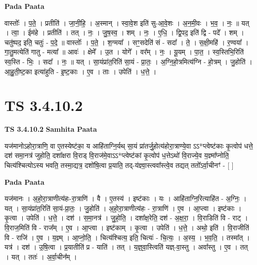 \documentclass[17pt]{extarticle}
\begin{document}
\textbf{Pada Paata} \newline

वास्तोः᳚ । प॒ते॒ । प्रतीति॑ । जा॒नी॒हि॒ । अ॒स्मान् । स्वा॒वे॒श इति॑ सु-आ॒वे॒शः । अ॒न॒मी॒वः । भ॒व॒ । नः॒ ॥ यत् । त्वा॒ । ईम॑हे । प्रतीति॑ । तत् । नः॒ । जु॒ष॒स्व॒ । शम् । नः॒ । ए॒धि॒ । द्वि॒पद॒ इति॑ द्वि - पदे᳚ । शम् । चतु॑ष्पद॒ इति॒ चतुः॑ - प॒दे॒ ॥ वास्तोः᳚ । प॒ते॒ । श॒ग्मया᳚ । सꣳ॒॒सदेति॑ सं - सदा᳚ । ते॒ । स॒क्षी॒महि॑ । र॒ण्वया᳚ । गा॒तु॒मत्येति॑ गातु - मत्या᳚ ॥ आवः॑ । क्षेमे᳚ । उ॒त । योगे᳚ । वर᳚म् । नः॒ । यू॒यम् । पा॒त॒ । स्व॒स्तिभि॒रिति॑ स्व॒स्ति - भिः॒ । सदा᳚ । नः॒ ॥ यत् । सा॒यंप्रा॑त॒रिति॑ सा॒यं - प्रा॒तः॒ । अ॒ग्नि॒हो॒त्रमित्य॑ग्नि - हो॒त्रम् । जु॒होति॑ । आ॒हु॒ती॒ष्ट॒का इत्या॑हुति - इ॒ष्ट॒काः । ए॒व । ताः । उपेति॑ । ध॒त्ते॒ ।  \newline




\section*{ TS 3.4.10.2 }

\textbf{TS 3.4.10.2 } \newline
\textbf{Samhita Paata} \newline

यज॑मानोऽहोरा॒त्राणि॒ वा ए॒तस्येष्ट॑का॒ य आहि॑ताग्नि॒र्यथ् सा॒यं प्रा॑तर्जु॒होत्य॑होरा॒त्राण्ये॒वा ऽऽ*प्त्वेष्ट॑काः कृ॒त्वोप॑ धत्ते॒ दश॑ समा॒नत्र॑ जुहोति॒ दशा᳚क्षरा वि॒राड् वि॒राज॑मे॒वाऽऽ*प्त्वेष्ट॑कां कृ॒त्वोप॑ ध॒त्तेऽथो॑ वि॒राज्ये॒व य॒ज्ञ्मा᳚प्नोति॒ चित्य॑श्चित्योऽस्य भवति॒ तस्मा॒द्यत्र॒ दशो॑षि॒त्वा प्र॒याति॒ तद्-य॑ज्ञ्वा॒स्त्ववा᳚स्त्वे॒व तद्यत् ततो᳚ऽर्वा॒चीनꣳ॑ - [  ] \newline

\textbf{Pada Paata} \newline

यज॑मानः । अ॒हो॒रा॒त्राणीत्य॑हः-रा॒त्राणि॑ । वै । ए॒तस्य॑ । इष्ट॑काः । यः । आहि॑ताग्नि॒रित्याहि॑त - अ॒ग्निः॒ । यत् । सा॒यंप्रा॑त॒रिति॑ सा॒यं-प्रा॒तः॒ । जु॒होति॑ । अ॒हो॒रा॒त्राणीत्य॑हः - रा॒त्राणि॑ । ए॒व । आ॒प्त्वा । इष्ट॑काः । कृ॒त्वा । उपेति॑ । ध॒त्ते॒ । दश॑ । स॒मा॒नत्र॑ । जु॒हो॒ति॒ । दशा᳚क्ष॒रेति॒ दश॑ - अ॒क्ष॒रा॒ । वि॒राडिति॑ वि - राट् । वि॒राज॒मिति॑ वि - राज᳚म् । ए॒व । आ॒प्त्वा । इष्ट॑काम् । कृ॒त्वा । उपेति॑ । ध॒त्ते॒ । अथो॒ इति॑ । वि॒राजीति॑ वि - राजि॑ । ए॒व । य॒ज्ञ्म् । आ॒प्नो॒ति॒ । चित्य॑श्चित्य॒ इति॒ चित्यः॑ - चि॒त्यः॒ । अ॒स्य॒ । भ॒व॒ति॒ । तस्मा᳚त् । यत्र॑ । दश॑ । उ॒षि॒त्वा । प्र॒यातीति॑ प्र - याति॑ । तत् । य॒ज्ञ्॒वा॒स्त्विति॑ यज्ञ्-वा॒स्तु । अवा᳚स्तु । ए॒व । तत् । यत् । ततः॑ । अ॒र्वा॒चीन᳚म् ।  \newline
\end{document}
